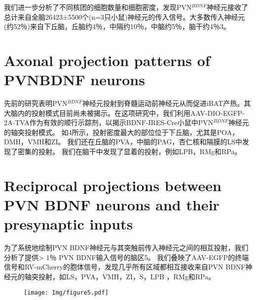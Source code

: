 我们进一步分析了不同核团的细胞数量和细胞密度，发现PVN$^{BDNF}$神经元接收了总计来自全脑26423±5500个(n=3只小鼠)神经元的传入信号。大多数传入神经元(约52％)来自下丘脑，丘脑约4％，中隔约10％，中脑约5％，脑干约4％\figurename{3}。

\section{Axonal projection patterns of PVNBDNF neurons}
先前的研究表明PVN$^{BDNF}$神经元投射到脊髓运动前神经元从而促进iBAT产热\citep{an2015discrete}。其大脑内的投射模式目前尚未被揭示。在这项研究中，我们利用AAV-DIO-EGFP-2A-TVA作为有效的顺行示踪剂，以揭示BDNF-IRES-Cre小鼠中PVN$^{BDNF}$神经元的轴突投射模式。 如\figurename{4}所示，投射密度最大的部位位于下丘脑，尤其是POA，DMH，VMH和ZI。 我们还在丘脑的PVA，中脑的PAG，杏仁核和隔膜的LS中发现了密集的投射。 我们在脑干中发现了显着的投射，例如LPB，RMg和RPa。

\section{Reciprocal projections between PVN BDNF neurons and their presynaptic inputs}
为了系统地绘制PVN BDNF神经元与其突触前传入神经元之间的相互投射，我们分析了提供> 1％ PVN BDNF输入信号的脑区\figurename{5}。 我们叠映了AAV-EGFP的终端信号和RV-mCherry的胞体信号，发现几乎所有区域都相互接收来自PVN BDNF神经元的轴突投射，如LS，PVA，VMH，ZI，S，LPB ，RMg和RPa。




\begin{figure}[!htbp]
    \centering
    \texttt{[image: Img/figure5.pdf]}
    \label{fig:figure5}
\end{figure}